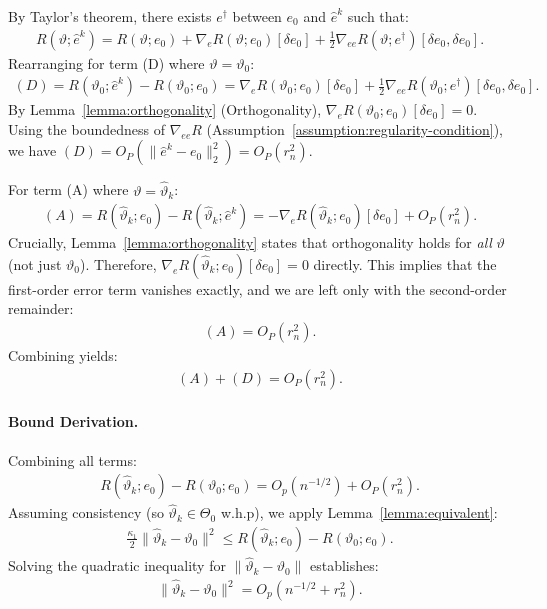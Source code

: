 By Taylor's theorem, there exists $e^{\dagger}$ between $e_0$ and $\hat{e}^{k}$ such that:
\begin{align}
    R(\vartheta; \widehat{e}^k) = R(\vartheta; e_0) + \nabla_{e}R(\vartheta; e_0)[\delta e_0] + \frac{1}{2}\nabla_{ee}R(\vartheta; e^{\dagger})[\delta e_0, \delta e_0].
\end{align}
Rearranging for term (D) where $\vartheta = \vartheta_0$:
\begin{align}
    (D) = R(\vartheta_0; \widehat{e}^k) - R(\vartheta_0; e_0) = \nabla_{e}R(\vartheta_0; e_0)[\delta e_0] + \frac{1}{2}\nabla_{ee}R(\vartheta_0; e^{\dagger})[\delta e_0, \delta e_0].
\end{align}
By Lemma~\ref{lemma:orthogonality} (Orthogonality), $\nabla_{e}R(\vartheta_0; e_0)[\delta e_0] = 0$. Using the boundedness of $\nabla_{ee}R$ (Assumption~\ref{assumption:regularity-condition}), we have $(D) = O_P(\| \widehat{e}^k - e_0 \|^2_2) = O_P(r^2_n)$.

For term (A) where $\vartheta = \widehat{\vartheta}_k$:
\begin{align}
    (A) = R(\widehat{\vartheta}_k; e_0) - R(\widehat{\vartheta}_k; \widehat{e}^{k}) = -\nabla_{e}R(\widehat{\vartheta}_k; e_0)[\delta e_0] + O_P(r_n^2).
\end{align}
Crucially, Lemma~\ref{lemma:orthogonality} states that orthogonality holds for \emph{all} $\vartheta$ (not just $\vartheta_0$). Therefore, $\nabla_{e}R(\widehat{\vartheta}_k; e_0)[\delta e_0] = 0$ directly. This implies that the first-order error term vanishes exactly, and we are left only with the second-order remainder:
\begin{align}
    (A)  = O_P(r^2_n).
\end{align}
Combining yields:
\begin{align}
    (A) + (D) = O_P(r^2_n). 
\end{align}

\paragraph{Bound Derivation.}
Combining all terms:
\begin{align}
    R(\widehat{\vartheta}_k; e_0) - R(\vartheta_0; e_0) = O_p(n^{-1/2}) + O_P(r^2_n). 
\end{align}
Assuming consistency (so $\widehat{\vartheta}_k \in \varTheta_0$ w.h.p), we apply Lemma~\ref{lemma:equivalent}:
\begin{align}
    \frac{\kappa_1}{2}\|\widehat{\vartheta}_k - \vartheta_0 \|^2 \leq  R(\widehat{\vartheta}_k; e_0) - R(\vartheta_0; e_0).
\end{align}
Solving the quadratic inequality for $\|\widehat{\vartheta}_k - \vartheta_0 \|$ establishes:
\begin{align}
    \|\widehat{\vartheta}_k - \vartheta_0 \|^2 = O_p(n^{-1/2} + r^2_n).
\end{align}


